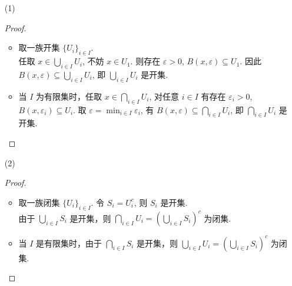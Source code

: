 \documentclass{article}
\begin{document}
\section{}

\begin{itemize}
    \item [(1)]
    \begin{proof} \quad
        \begin{itemize}
            \item 取一族开集 $\{U_i\}_{i \in I}$. \\
            任取 $x \in \bigcup_{i \in I}U_i$, 不妨 $x \in U_1$. 则存在 $\varepsilon > 0$, $B(x, \varepsilon) \subseteq U_1$. 因此 $B(x, \varepsilon) \subseteq \bigcup_{i \in I}U_i$, 即 $\bigcup_{i \in I}U_i$ 是开集. \\
            \item 当 $I$ 为有限集时，任取 $x \in \bigcap_{i \in I} U_i$, 对任意 $i \in I$ 有存在 $\varepsilon_i > 0$, $B(x, \varepsilon_i) \subseteq U_i$. 取 $\varepsilon = \min_{i \in I}{\varepsilon_i}$, 有 $B(x, \varepsilon) \subseteq \bigcap_{i \in I} U_i$, 即 $\bigcap_{i \in I} U_i$ 是开集.
        \end{itemize}
    \end{proof}
    \item [(2)]
    \begin{proof} \quad
        \begin{itemize}
            \item 取一族闭集 $\{U_i\}_{i \in I}$. 令 $S_i = U_i^c$, 则 $S_i$ 是开集. \\
            由于 $\bigcup_{i \in I} S_i$ 是开集，则 $\bigcap_{i \in I} U_i = \left(\bigcup_{i \in I} S_i\right)^c$ 为闭集.
            \item 当 $I$ 是有限集时，由于 $\bigcap_{i \in I} S_i$ 是开集，则 $\bigcup_{i \in I} U_i = \left(\bigcup_{i \in I} S_i\right)^c $ 为闭集.
        \end{itemize}
    \end{proof}
\end{itemize}

\section{}
\end{document}
